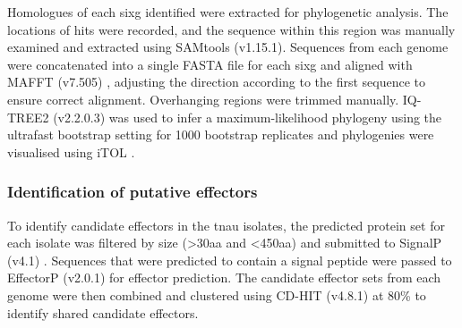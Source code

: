 Homologues of each \ac{sixg} identified were extracted for phylogenetic analysis.  The locations of hits were recorded, and the sequence within this region was manually examined and extracted using SAMtools (v1.15.1). Sequences from each genome were concatenated into a single FASTA file for each \ac{sixg} and aligned with  MAFFT (v7.505) \parencite{Katoh2019}, adjusting the direction according to the first sequence to ensure correct alignment. Overhanging regions were trimmed manually. IQ-TREE2 (v2.2.0.3) \parencite{Nguyen2015} was used to infer a maximum-likelihood phylogeny using the ultrafast bootstrap setting for 1000 bootstrap replicates and phylogenies were visualised using iTOL \parencite{Letunic2021}.

\subsubsection{Identification of putative effectors}

To identify candidate effectors in the \ac{tnau} isolates, the predicted protein set for each isolate was filtered by size (>30aa and <450aa) and submitted to SignalP (v4.1) \parencite{Petersen2011}. Sequences that were predicted to contain a signal peptide were passed to EffectorP (v2.0.1) \parencite{Sperschneider2018} for effector prediction. The candidate effector sets from each genome were then combined and clustered using CD-HIT (v4.8.1) \parencite{Fu2012} at 80\% to identify shared candidate effectors. 



